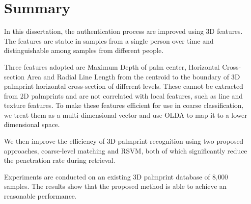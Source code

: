 \section{Summary}

In this dissertation, the authentication process are improved using 3D features. The features are stable in samples from a single person over time and distinguishable among samples from different people.

Three features adopted are Maximum Depth of palm center, Horizontal Cross-section Area and Radial Line Length from the centroid to the boundary of 3D palmprint horizontal cross-section of different levels. These cannot be extracted from 2D palmprints and are not correlated with local features, such as line and texture features. To make these features efficient for use in coarse classification, we treat them as a multi-dimensional vector and use OLDA to map it to a lower dimensional space.

We then improve the efficiency of 3D palmprint recognition using two proposed approaches, coarse-level matching and RSVM, both of which significantly reduce the penetration rate during retrieval.

Experiments are conducted on an existing 3D palmprint database of 8,000 samples. The results show that the proposed method is able to achieve an reasonable performance.
